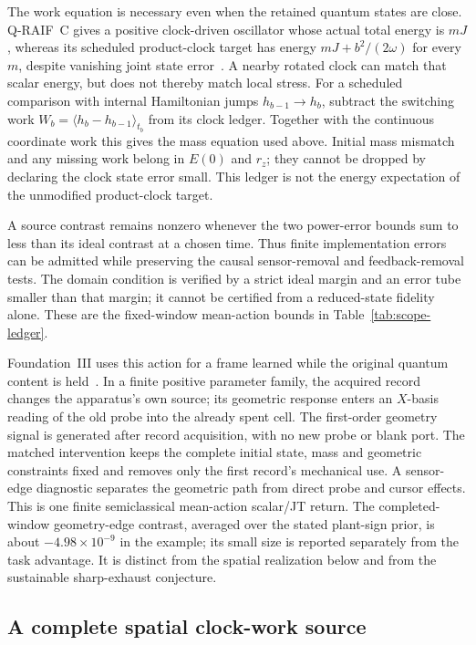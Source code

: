 \documentclass[12pt,a4paper]{article}
\begin{document}
The work equation is necessary even when the retained quantum states
are close. Q-RAIF~C gives a positive clock-driven oscillator whose
actual total energy is $mJ$, whereas its scheduled product-clock target
has energy $mJ+b^2/(2\omega)$ for every $m$, despite vanishing joint
state error~\cite{QRC}. A nearby rotated clock can match that scalar
energy, but does not thereby match local stress. For a scheduled
comparison with internal Hamiltonian jumps $h_{b-1}\to h_b$, subtract
the switching work
$W_b=\langle h_b-h_{b-1}\rangle_{t_b}$ from its clock ledger.
Together with the continuous coordinate work this gives the mass
equation used above. Initial mass mismatch and any missing work belong
in $E(0)$ and $r_z$; they cannot be dropped by declaring the clock
state error small. This ledger is not the energy expectation of the
unmodified product-clock target.

A source contrast remains nonzero whenever the two power-error bounds
sum to less than its ideal contrast at a chosen time. Thus finite
implementation errors can be admitted while preserving the causal
sensor-removal and feedback-removal tests. The domain condition is
verified by a strict ideal margin and an error tube smaller than that
margin; it cannot be certified from a reduced-state fidelity alone.
These are the fixed-window mean-action bounds in
Table~\ref{tab:scope-ledger}.

Foundation~III uses this action for a frame learned while the original
quantum content is held~\cite{FoundationIII}. In a finite positive
parameter family, the acquired record changes the apparatus's own
source; its geometric response enters an $X$-basis reading of the old
probe into the already spent cell. The first-order geometry signal is
generated after record acquisition, with no new probe or blank port.
The matched intervention keeps the complete
initial state, mass and geometric constraints fixed and removes only
the first record's mechanical use. A sensor-edge diagnostic separates
the geometric path from direct probe and cursor effects. This is one
finite semiclassical mean-action scalar/JT return. The completed-window
geometry-edge contrast, averaged over the stated plant-sign prior,
is about $-4.98\times10^{-9}$ in the example;
its small size is reported separately from the task advantage.
It is distinct from the spatial realization below
and from the sustainable sharp-exhaust conjecture.

\subsection{A complete spatial clock-work source}
\label{sec:spatial-clock-work}
\end{document}
